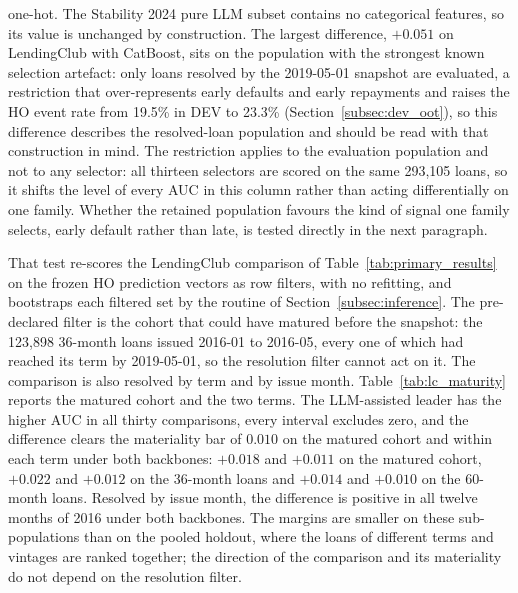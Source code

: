 \documentclass[final,5p,twocolumn]{elsarticle}
\begin{document}
one-hot. The Stability 2024 pure LLM subset contains no categorical features, so its value is unchanged by construction. The largest difference, $+0.051$ on LendingClub with CatBoost, sits on the population with the strongest known selection artefact: only loans resolved by the 2019-05-01 snapshot are evaluated, a restriction that over-represents early defaults and early repayments and raises the HO event rate from 19.5\% in DEV to 23.3\% (Section~\ref{subsec:dev_oot}), so this difference describes the resolved-loan population and should be read with that construction in mind. The restriction applies to the evaluation population and not to any selector: all thirteen selectors are scored on the same 293,105 loans, so it shifts the level of every AUC in this column rather than acting differentially on one family. Whether the retained population favours the kind of signal one family selects, early default rather than late, is tested directly in the next paragraph.

That test re-scores the LendingClub comparison of Table~\ref{tab:primary_results} on the frozen HO prediction vectors as row filters, with no refitting, and bootstraps each filtered set by the routine of Section~\ref{subsec:inference}. The pre-declared filter is the cohort that could have matured before the snapshot: the 123,898 36-month loans issued 2016-01 to 2016-05, every one of which had reached its term by 2019-05-01, so the resolution filter cannot act on it. The comparison is also resolved by term and by issue month. Table~\ref{tab:lc_maturity} reports the matured cohort and the two terms. The LLM-assisted leader has the higher AUC in all thirty comparisons, every interval excludes zero, and the difference clears the materiality bar of $0.010$ on the matured cohort and within each term under both backbones: $+0.018$ and $+0.011$ on the matured cohort, $+0.022$ and $+0.012$ on the 36-month loans and $+0.014$ and $+0.010$ on the 60-month loans. Resolved by issue month, the difference is positive in all twelve months of 2016 under both backbones. The margins are smaller on these sub-populations than on the pooled holdout, where the loans of different terms and vintages are ranked together; the direction of the comparison and its materiality do not depend on the resolution filter.
\end{document}
